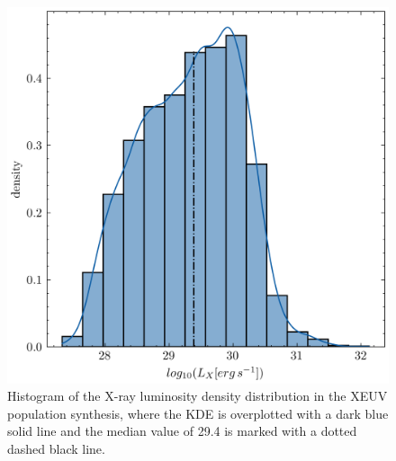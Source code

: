 \documentclass[fleqn,usenatbib,letters]{mnras}
\begin{document}
\begin{figure}
    \includegraphics[width=0.95\columnwidth]{Lx}
    \caption{Histogram of the X-ray luminosity density distribution in the XEUV population synthesis, where the KDE is overplotted with a dark blue solid line and the median value of 29.4 is marked with a dotted dashed black line. \label{fig:Lx}}
\end{figure}
\end{document}
